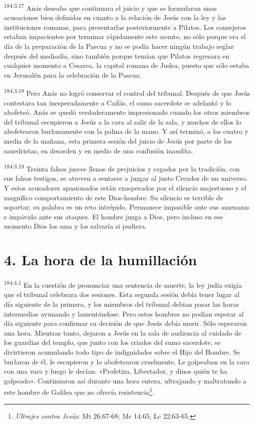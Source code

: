 \par 
\textsuperscript{184:3.17} Anás deseaba que continuara el juicio y que se formularan unas acusaciones bien definidas en cuanto a la relación de Jesús con la ley y las instituciones romanas, para presentarlas posteriormente a Pilatos. Los consejeros estaban impacientes por terminar rápidamente este asunto, no sólo porque era el día de la preparación de la Pascua y no se podía hacer ningún trabajo seglar después del mediodía, sino también porque temían que Pilatos regresara en cualquier momento a Cesarea, la capital romana de Judea, puesto que sólo estaba en Jerusalén para la celebración de la Pascua.

\par 
\textsuperscript{184:3.18} Pero Anás no logró conservar el control del tribunal. Después de que Jesús contestara tan inesperadamente a Caifás, el sumo sacerdote se adelantó y lo abofeteó. Anás se quedó verdaderamente impresionado cuando los otros miembros del tribunal escupieron a Jesús a la cara al salir de la sala, y muchos de ellos lo abofetearon burlonamente con la palma de la mano. Y así terminó, a las cuatro y media de la mañana, esta primera sesión del juicio de Jesús por parte de los sanedristas, en desorden y en medio de una confusión inaudita.

\par 
\textsuperscript{184:3.19} Treinta falsos jueces llenos de prejuicios y cegados por la tradición, con sus falsos testigos, se atreven a sentarse a juzgar al justo Creador de un universo. Y estos acusadores apasionados están exasperados por el silencio majestuoso y el magnífico comportamiento de este Dios-hombre. Su silencio es terrible de soportar; su palabra es un reto intrépido. Permanece impasible ante sus amenazas e impávido ante sus ataques. El hombre juzga a Dios, pero incluso en ese momento Dios los ama y los salvaría si pudiera.

\section*{4. La hora de la humillación}
\par 
\textsuperscript{184:4.1} En la cuestión de pronunciar una sentencia de muerte, la ley judía exigía que el tribunal celebrara dos sesiones. Esta segunda sesión debía tener lugar al día siguiente de la primera, y los miembros del tribunal debían pasar las horas intermedias ayunando y lamentándose. Pero estos hombres no podían esperar al día siguiente para confirmar su decisión de que Jesús debía morir. Sólo esperaron una hora. Mientras tanto, dejaron a Jesús en la sala de audiencia al cuidado de los guardias del templo, que junto con los criados del sumo sacerdote, se divirtieron acumulando todo tipo de indignidades sobre el Hijo del Hombre. Se burlaron de él, le escupieron y lo abofetearon cruelmente. Le golpeaban en la cara con una vara y luego le decían: «Profetiza, Libertador, y dinos quién te ha golpeado». Continuaron así durante una hora entera, ultrajando y maltratando a este hombre de Galilea que no ofrecía resistencia\footnote{\textit{Ultrajes contra Jesús}: Mt 26:67-68; Mc 14:65; Lc 22:63-65.}.

